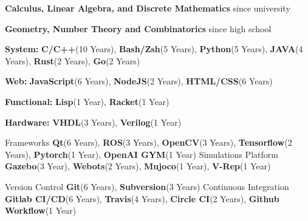 




\begin{cvskills}

{
\begin{cvitems} %
      \item {\textbf{Calculus, Linear Algebra, and Discrete Mathematics} since university}
      \item {\textbf{Geometry, Number Theory and Combinatorics} since high school}
\end{cvitems}
}

{
\begin{cvitems}
      \item {\textbf{System: }\textbf{C/C++}(10 Years), \textbf{Bash/Zsh}(5 Years), \textbf{Python}(5 Years), \textbf{JAVA}(4 Years), \textbf{Rust}(2 Years), \textbf{Go}(2 Years)}
      \item {\textbf{Web: }\textbf{JavaScript}(6 Years), \textbf{NodeJS}(2 Years), \textbf{HTML/CSS}(6 Years)}
      \item {\textbf{Functional: }\textbf{Lisp}(1 Year), \textbf{Racket}(1 Year)}
      \item {\textbf{Hardware: }\textbf{VHDL}(3 Years), \textbf{Verilog}(1 Year)}
\end{cvitems}
} %

  \cvskill
    {Frameworks} %
    {\textbf{Qt}(6 Years), \textbf{ROS}(3 Years), \textbf{OpenCV}(3 Years), \textbf{Tensorflow}(2 Years), \textbf{Pytorch}(1 Year), \textbf{OpenAI GYM}(1 Year)} %
  \cvskill
    {Simulations Platform} %
    {\textbf{Gazebo}(3 Year), \textbf{Webots}(2 Years), \textbf{Mujoco}(1 Year), \textbf{V-Rep}(1 Year)} %
    
  \cvskill
    {Version Control} %
    {\textbf{Git}(6 Years), \textbf{Subversion}(3 Years)} %
  \cvskill
    {Continuous Integration} %
    {\textbf{Gitlab CI/CD}(6 Years), \textbf{Travis}(4 Years), \textbf{Circle CI}(2 Years), \textbf{Github Workflow}(1 Year)} %


\end{cvskills}
